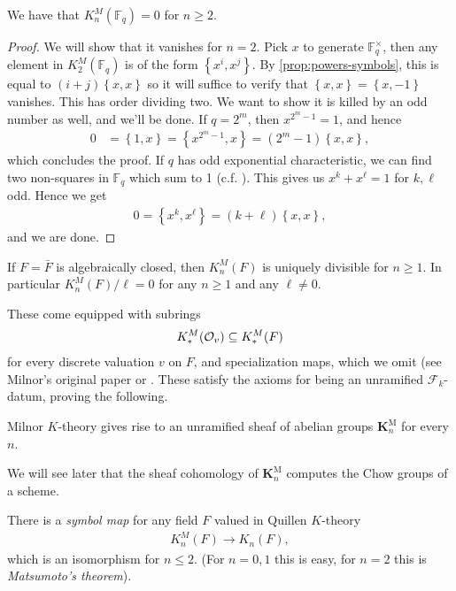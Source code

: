 \documentclass[11pt,openany]{book}
\providecommand{\KM}{\mathbf{K}^\mathrm{M}}
\begin{document}
%
\begin{example} \cite[III.6.1,~III.7.2]{Kbook}
We have that $K_n^M(\mathbb{F}_q) =0$ for $n\ge 2$.
\end{example}
\begin{proof} We will show that it vanishes for $n=2$. Pick $x$ to generate $\mathbb{F}_q^\times$, then any element in $K_2^M(\mathbb{F}_q)$ is of the form $\left\{ x^i,x^j \right\}$. By \autoref{prop:powers-symbols}, this is equal to $(i+j) \left\{ x,x \right\}$ so it will suffice to verify that $\left\{ x,x \right\} = \left\{ x,-1 \right\}$ vanishes. This has order dividing two. We want to show it is killed by an odd number as well, and we'll be done. If $q = 2^m$, then $x^{2^m-1}=1$, and hence
\begin{align*}
    0 &= \left\{ 1,x \right\} = \left\{ x^{2^m-1},x \right\} = \left( 2^m-1 \right)\left\{ x,x \right\},
\end{align*}
which concludes the proof. If $q$ has odd exponential characteristic, we can find two non-squares in $\mathbb{F}_q$ which sum to 1 (c.f. \cite[1.3.6]{GS}). This gives us $x^k + x^\ell = 1$ for $k,\ell$ odd. Hence we get
\begin{align*}
    0 = \left\{ x^k,x^\ell \right\} = (k+ \ell) \left\{ x,x \right\},
\end{align*}
and we are done.
\end{proof}


\begin{example} \cite[III.7.2]{Kbook}
If $F = \bar{F}$ is algebraically closed, then $K_n^M(F)$ is uniquely divisible for $n\ge1$. In particular $K_n^M(F)/\ell = 0$ for any $n\ge 1$ and any $\ell\ne 0$.
\end{example}

%
These come equipped with subrings
\begin{align*}
    K^M_\ast(\mathcal{O}_v) \subseteq K^M_\ast(F)
\end{align*}
for every discrete valuation $v$ on $F$, and specialization maps, which we omit (see Milnor's original paper or \cite[7.3]{Kbook}. These satisfy the axioms for being an unramified $\mathcal{F}_k$-datum, proving the following.
\begin{proposition} Milnor $K$-theory gives rise to an unramified sheaf of abelian groups $\KM_n$ for every $n$.
\end{proposition}

We will see later that the sheaf cohomology of $\KM_n$ computes the Chow groups of a scheme.

\begin{proposition} There is a \textit{symbol map} for any field $F$ valued in Quillen $K$-theory
\begin{align*}
    K_n^M(F) \to K_n(F),
\end{align*}
which is an isomorphism for $n\le 2$. (For $n=0,1$ this is easy, for $n=2$ this is \textit{Matsumoto's theorem}).
\end{proposition}
\end{document}
